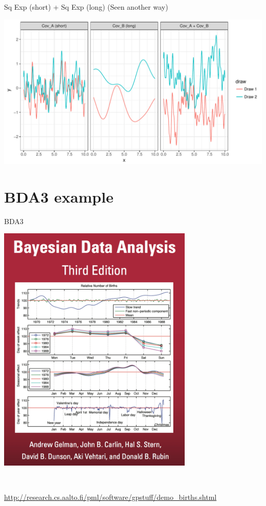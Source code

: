 \documentclass[11pt,ignorenonframetext,]{beamer}
\begin{document}
\begin{frame}[t]{Sq Exp (short) + Sq Exp (long) (Seen another way)}

\begin{center}\includegraphics{Lec14_files/figure-beamer/unnamed-chunk-21-1} \end{center}

\end{frame}

\section{BDA3 example}\label{bda3-example}

\begin{frame}{BDA3}

\begin{center}
\includegraphics[width=0.7\textwidth]{figs/bda_cover.png} 

$~$

\vspace{-3mm}
\url{http://research.cs.aalto.fi/pml/software/gpstuff/demo_births.shtml}
\end{center}

\end{frame}
\end{document}
